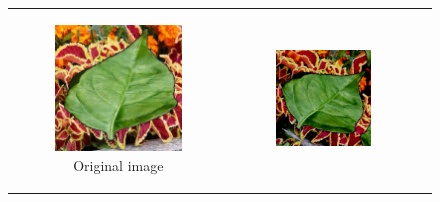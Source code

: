 \documentclass{BachelorBUI}
\begin{document}
        \begin{figure}[!h]
            \centering
            \begin{tabular}{ccc}
                \begin{subfigure}{0.30\textwidth}
                    \centering
                    \includegraphics[width=\textwidth]{original_image.jpg}
                    \caption{\centering Original image}
                \end{subfigure} &
                \begin{subfigure}{0.30\textwidth}
                    \centering
                    \includegraphics[width=\textwidth]{1_pipeline.png}

\end{subfigure}
\end{tabular}
\end{figure}
\end{document}
